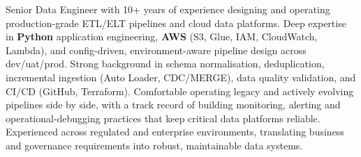 

\begin{cvparagraph}

Senior Data Engineer with 10+ years of experience designing and operating production-grade ETL/ELT pipelines and cloud data platforms. Deep expertise in \textbf{Python} application engineering, \textbf{AWS} (S3, Glue, IAM, CloudWatch, Lambda), and config-driven, environment-aware pipeline design across dev/uat/prod. Strong background in schema normalisation, deduplication, incremental ingestion (Auto Loader, CDC/MERGE), data quality validation, and CI/CD (GitHub, Terraform). Comfortable operating legacy and actively evolving pipelines side by side, with a track record of building monitoring, alerting and operational-debugging practices that keep critical data platforms reliable. Experienced across regulated and enterprise environments, translating business and governance requirements into robust, maintainable data systems.
\end{cvparagraph}
